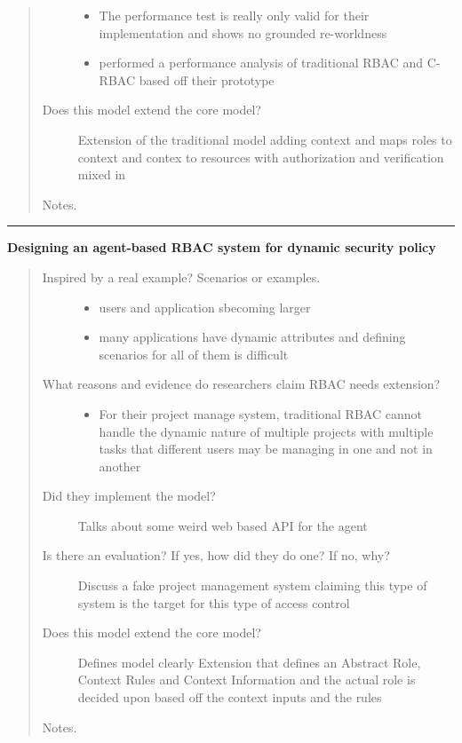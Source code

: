 \documentclass[letterpaper,10pt,english]{sphinxmanual}
\begin{document}
\begin{quote}
\begin{description}
\begin{itemize}
\item {} 
The performance test is really only valid for their implementation and shows no grounded re-worldness

\item {} 
performed a performance analysis of traditional RBAC and C-RBAC based off their prototype

\end{itemize}

\item[{Does this model extend the core model?}] \leavevmode
Extension of the traditional model adding context and maps roles to context and contex to resources with authorization and verification mixed in

\end{description}

Notes.
\end{quote}


\bigskip\hrule{}\bigskip


\textbf{Designing an agent-based RBAC system for dynamic security policy}
\begin{quote}
\begin{description}
\item[{Inspired by a real example? Scenarios or examples.}] \leavevmode\begin{itemize}
\item {} 
users and application sbecoming larger

\item {} 
many applications have dynamic attributes and defining scenarios for all of them is difficult

\end{itemize}

\item[{What reasons and evidence do researchers claim RBAC needs extension?}] \leavevmode\begin{itemize}
\item {} 
For their project manage system, traditional RBAC cannot handle the dynamic nature of multiple projects with multiple tasks that different users may be managing in one and not in another

\end{itemize}

\item[{Did they implement the model?}] \leavevmode
Talks about some weird web based API for the agent

\item[{Is there an evaluation? If yes, how did they do one? If no, why?}] \leavevmode
Discuss a fake project management system claiming this type of system is the target for this type of access control

\item[{Does this model extend the core model?}] \leavevmode
Defines model clearly
Extension that defines an Abstract Role, Context Rules and Context Information and the actual role is decided upon based off the context inputs and the rules

\end{description}

Notes.
\end{quote}
\end{document}

